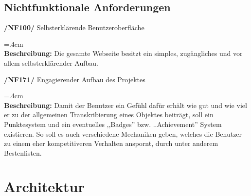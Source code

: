 \documentclass{article}
\newenvironment{funcD}{\vspace{-.6cm}\\\par\begingroup\leftskip=.4cm\noindent\\}{\\\par\endgroup\noindent}
\begin{document}
\subsection{Nichtfunktionale Anforderungen}
\textbf{/NF100/} Selbsterklärende Benutzeroberfläche
\begin{funcD}
    \textbf{Beschreibung:} Die gesamte Webseite besitzt ein simples, zugängliches und vor allem selbsterklärender Aufbau. 
\end{funcD}
\textbf{/NF171/} Engagierender Aufbau des Projektes
\begin{funcD}
    \textbf{Beschreibung:} Damit der Benutzer ein Gefühl dafür erhält wie gut und wie viel er zu der allgemeinen Transkribierung eines Objektes beiträgt, soll ein Punktesystem und ein eventuelles ,,Badges'' bzw. ..Achievement'' System existieren. So soll es auch verschiedene Mechaniken geben, welches die Benutzer zu einem eher kompetitiveren Verhalten anspornt, durch unter anderem Bestenlisten.
\end{funcD}

\section{Architektur}
\end{document}
